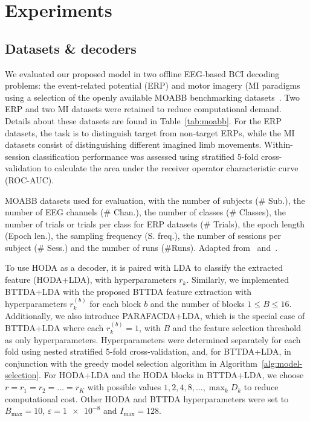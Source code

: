 \section{Experiments}
\subsection{Datasets \& decoders}
We evaluated our proposed model in two offline EEG-based BCI decoding problems:
the event-related potential (ERP) and motor imagery (MI paradigms using a
selection of the openly available MOABB benchmarking datasets~\cite{Aristimunha2023}.
Two ERP and two MI datasets were retained to reduce computational
demand.
Details about these datasets are found in Table~\ref{tab:moabb}.
For the ERP datasets, the task is to distinguish target from non-target ERPs,
while the MI datasets consist of distinguishing different imagined limb
movements.
Within-session classification performance was assessed using stratified 5-fold
cross-validation to calculate the area under the receiver operator
characteristic curve (ROC-AUC).
\begin{table}[t]
	\centering
	\footnotesize
	
  \caption[MOABB datasets used for evaluation.]{MOABB datasets used for evaluation, with the number of
		subjects (\# Sub.), the number of EEG channels (\# Chan.), the number of
    classes (\# Classes), the number of trials or trials per class for ERP
    datasets (\# Trials), the epoch length (Epoch len.), the sampling
		frequency (S. freq.), the number of sessions per subject (\# Sess.) and the
		number of runs (\#Runs).
    Adapted from~\cite{Aristimunha2023}
    and~\cite{Chevallier2024}.}
	\label{tab:moabb}
\end{table}

To use HODA as a decoder, it is paired with LDA to classify the
extracted feature (HODA+LDA), with hyperparameters $r_k$.
Similarly, we implemented BTTDA+LDA with the proposed BTTDA feature
extraction with hyperparameters $r_k^{(b)}$ for each block $b$ and the number of blocks
$1\leq B\leq16$.
Additionally, we also introduce PARAFACDA+LDA, which is the special case of
BTTDA+LDA where each $r_k^{(b)}=1$, with $B$ and the feature selection
threshold as only hyperparameters.
Hyperparameters were determined separately for each fold using nested
stratified 5-fold cross-validation, and, for BTTDA+LDA, in conjunction with the
greedy model selection algorithm in Algorithm~\ref{alg:model-selection}.
For HODA+LDA and the HODA blocks in BTTDA+LDA, we choose
$r=r_1=r_2=\ldots=r_K$ with possible values
$\textstyle{1,2,4,8,\ldots,\max_kD_k}$
to reduce computational cost.
Other HODA and BTTDA hyperparameters were set to
$B_\text{max}=10$, $\varepsilon=\num{1e-8}$ and $I_\text{max}=128$.

